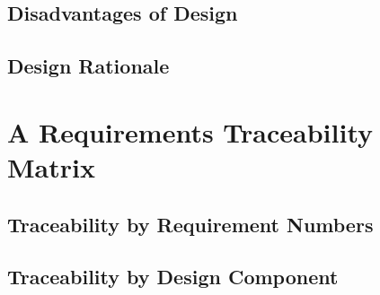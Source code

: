\documentclass{report}
\begin{document}
\subsection{Disadvantages of Design}
\subsection{Design Rationale}
\section{A Requirements Traceability Matrix}
\subsection{Traceability by Requirement Numbers}
\subsection{Traceability by Design Component}
\end{document}
